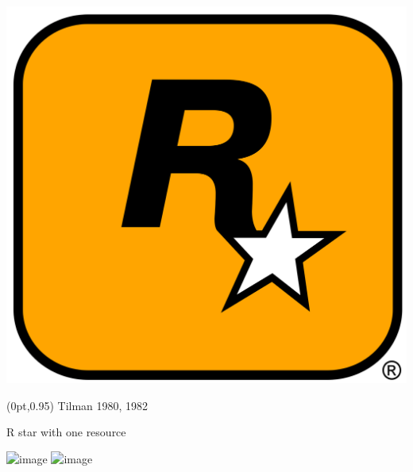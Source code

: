 \documentclass[12pt]{beamer}
\newcommand\FrameText[1]{%
  \begin{textblock*}{\paperwidth}(0pt,0.95\textheight)
    \raggedleft #1\hspace{.5em}
  \end{textblock*}}
\begin{document}
\begin{frame}
  \begin{center}
    \includegraphics[height=.5\textheight]{pics/rockstar_logo}
  \end{center}
  \FrameText{\small Tilman 1980, 1982}


\end{frame}

\begin{frame}{R star with one resource}
  \begin{center}
    \vspace{-4ex}
    \includegraphics<1>[height=.8\textheight]{figs/rstar1_alpha_1}
    \includegraphics<2>[height=.8\textheight]{figs/rstar1_alpha_3}
  \end{center}
\end{frame}
\end{document}
